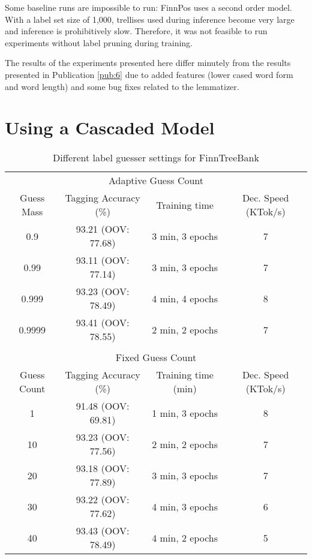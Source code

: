 Some baseline runs are impossible to run: FinnPos uses a second order
model. With a label set size of 1,000, trellises used during inference
become very large and inference is prohibitively slow. Therefore, it
was not feasible to run experiments without label pruning during
training.

The results of the experiments presented here differ minutely from the
results presented in Publication \ref{pub:6} due to added features
(lower cased word form and word length) and some bug fixes related to
the lemmatizer.

\section{Using a Cascaded Model}

\begin{table}[htb!]
\begin{center}
\begin{tabular}{cccc}
\multicolumn{4}{c}{Adaptive Guess Count}\\
Guess Mass & Tagging Accuracy (\%) & Training time & Dec. Speed (KTok/s)\\
\hline
0.9        & 93.21 (OOV: 77.68) & 3 min, 3 epochs &   7          \\
0.99       & 93.11 (OOV: 77.14) & 3 min, 3 epochs & 7            \\
0.999      & 93.23 (OOV: 78.49) & 4 min, 4 epochs            & 8            \\
0.9999      & 93.41 (OOV: 78.55) & 2 min, 2 epochs            & 7            \\
           &                  &               &               \\
\multicolumn{4}{c}{Fixed Guess Count}\\
Guess Count & Tagging Accuracy (\%) & Training time (min) & Dec. Speed (KTok/s) \\
\hline
1        & 91.48 (OOV: 69.81)           & 1 min, 3 epochs            & 8            \\
10       & 93.23 (OOV: 77.56)           & 2 min, 2 epochs            & 7            \\
20       & 93.18 (OOV: 77.89)           & 3 min, 3 epochs            & 7            \\
30       & 93.22 (OOV: 77.62)           & 4 min, 3 epochs            & 6            \\
40       & 93.43 (OOV: 78.49)           & 4 min, 2 epochs            & 5            \\
\end{tabular}
\caption{Different label guesser settings for FinnTreeBank}
\end{center}
\end{table}


